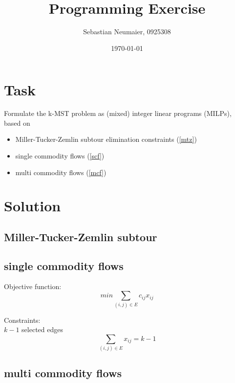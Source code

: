 \documentclass{article}
\title{Programming Exercise}
\author{Sebastian Neumaier, 0925308}
\date{\today}
\begin{document}
\maketitle

\section{Task}

Formulate the k-MST problem as (mixed) integer linear programs (MILPs), based on
\begin{itemize}
\item Miller-Tucker-Zemlin subtour elimination constraints (\ref{mtz})
\item single commodity flows (\ref{scf})
\item multi commodity flows (\ref{mcf})
\end{itemize}
\section{Solution}

\subsection{Miller-Tucker-Zemlin subtour \label{mtz}}


\subsection{single commodity flows \label{scf}}
Objective function:
\begin{equation}
min \sum_{(i,j) \in E} c_{ij} x_{ij}
\end{equation}

Constraints:\\
$k-1$ selected edges
\begin{equation}
\sum_{(i,j) \in E} x_{ij} = k - 1
\end{equation}

\subsection{multi commodity flows \label{mcf}}
\end{document}
